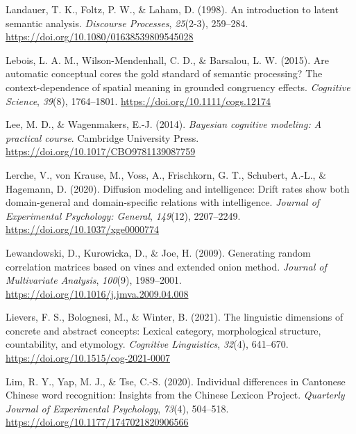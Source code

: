 \documentclass[
  12pt,
  man,floatsintext]{apa7}
\newlength{\cslhangindent}
\newlength{\cslentryspacingunit} %
\newenvironment{CSLReferences}[2] %
 {%
  \setlength{\parindent}{0pt}
  \ifodd #1
  \let\oldpar\par
  \def\par{\hangindent=\cslhangindent\oldpar}
  \fi
  \setlength{\parskip}{#2\cslentryspacingunit}
 }%
 {}
\begin{document}
\begin{CSLReferences}{1}{0}
\leavevmode{}%
Landauer, T. K., Foltz, P. W., \& Laham, D. (1998). An introduction to latent semantic analysis. \emph{Discourse Processes}, \emph{25}(2-3), 259--284. \url{https://doi.org/10.1080/01638539809545028}

\leavevmode{}%
Lebois, L. A. M., Wilson-Mendenhall, C. D., \& Barsalou, L. W. (2015). Are automatic conceptual cores the gold standard of semantic processing? {The} context-dependence of spatial meaning in grounded congruency effects. \emph{Cognitive Science}, \emph{39}(8), 1764--1801. \url{https://doi.org/10.1111/cogs.12174}

\leavevmode{}%
Lee, M. D., \& Wagenmakers, E.-J. (2014). \emph{Bayesian cognitive modeling: {A} practical course}. {Cambridge University Press}. \url{https://doi.org/10.1017/CBO9781139087759}

\leavevmode{}%
Lerche, V., von Krause, M., Voss, A., Frischkorn, G. T., Schubert, A.-L., \& Hagemann, D. (2020). Diffusion modeling and intelligence: {Drift} rates show both domain-general and domain-specific relations with intelligence. \emph{Journal of Experimental Psychology: General}, \emph{149}(12), 2207--2249. \url{https://doi.org/10.1037/xge0000774}

\leavevmode{}%
Lewandowski, D., Kurowicka, D., \& Joe, H. (2009). Generating random correlation matrices based on vines and extended onion method. \emph{Journal of Multivariate Analysis}, \emph{100}(9), 1989--2001. \url{https://doi.org/10.1016/j.jmva.2009.04.008}

\leavevmode{}%
Lievers, F. S., Bolognesi, M., \& Winter, B. (2021). The linguistic dimensions of concrete and abstract concepts: Lexical category, morphological structure, countability, and etymology. \emph{Cognitive Linguistics}, \emph{32}(4), 641--670. \url{https://doi.org/10.1515/cog-2021-0007}

\leavevmode{}%
Lim, R. Y., Yap, M. J., \& Tse, C.-S. (2020). Individual differences in {Cantonese Chinese} word recognition: {Insights} from the {Chinese Lexicon Project}. \emph{Quarterly Journal of Experimental Psychology}, \emph{73}(4), 504--518. \url{https://doi.org/10.1177/1747021820906566}


\end{CSLReferences}
\end{document}
